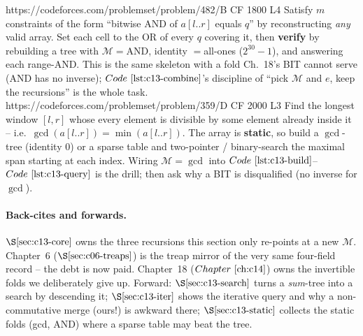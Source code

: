 \begin{practiceset}
    {https://codeforces.com/problemset/problem/482/B}
    {CF 1800 L4}
    {Satisfy \(m\) constraints of the form ``bitwise AND of \(a[l..r]\) equals
     \(q\)'' by reconstructing \emph{any} valid array.  Set each cell to the OR
     of every \(q\) covering it, then \textbf{verify} by rebuilding a tree with
     \(\mathcal{M}=\)AND, identity \(=\)all-ones (\(2^{30}{-}1\)), and answering
     each range-AND.  This is the same skeleton with a fold Ch.~18's BIT cannot
     serve (AND has no inverse); \(\coderef{c13-combine}\)'s discipline of
     ``pick \(\mathcal{M}\) and \(e\), keep the recursions'' is the whole task.}
    {https://codeforces.com/problemset/problem/359/D}
    {CF 2000 L3}
    {Find the longest window \([l,r]\) whose every element is divisible by some
     element already inside it -- i.e.\ \(\gcd(a[l..r])=\min(a[l..r])\).  The
     array is \textbf{static}, so build a \(\gcd\)-tree (identity \(0\)) or a
     sparse table and two-pointer / binary-search the maximal span starting at
     each index.  Wiring \(\mathcal{M}=\gcd\) into
     \(\coderef{c13-build}\)--\(\coderef{c13-query}\) is the drill; then ask why
     a BIT is disqualified (no inverse for \(\gcd\)).}
\end{practiceset}

\paragraph{Back-cites and forwards.}
\(\secref{c13-core}\) owns the three recursions this section only re-points at a
new \(\mathcal{M}\).  Chapter~6 (\(\secref{c06-treaps}\)) is the treap mirror of
the very same four-field record -- the debt is now paid.  Chapter~18
(\(\chref{c14}\)) owns the invertible folds we deliberately give up.  Forward:
\(\secref{c13-search}\) turns a \emph{sum}-tree into a search by descending it;
\(\secref{c13-iter}\) shows the iterative query and why a non-commutative merge
(ours!) is awkward there; \(\secref{c13-static}\) collects the static folds
(gcd, AND) where a sparse table may beat the tree.

